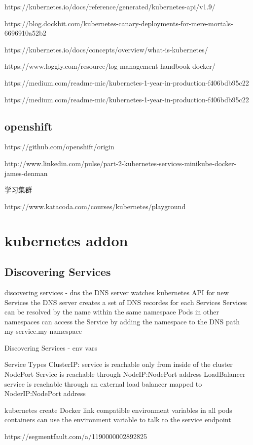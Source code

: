 https://kubernetes.io/docs/reference/generated/kubernetes-api/v1.9/


https://blog.dockbit.com/kubernetes-canary-deployments-for-mere-mortals-6696910a52b2

https://kubernetes.io/docs/concepts/overview/what-is-kubernetes/

https://www.loggly.com/resource/log-management-handbook-docker/

https://medium.com/readme-mic/kubernetes-1-year-in-production-f406bdb95c22


https://medium.com/readme-mic/kubernetes-1-year-in-production-f406bdb95c22

\subsection{openshift}

https://github.com/openshift/origin

http://www.linkedin.com/pulse/part-2-kubernetes-services-minikube-docker-james-denman


学习集群

https://www.katacoda.com/courses/kubernetes/playground


\section{kubernetes addon}


\subsection{Discovering Services}
discovering services - dns
the DNS server watches kubernetes API for new Services
the DNS server creates a set of DNS recordes for each Services
Services can be resolved by the name within the same namespace
Pods in other namespaces can access the Service by adding the namespace to the DNS path
  my-service.my-namespace

Discovering Services - env vars

Service Types
 ClusterIP: service is reachable only from inside of the cluster
NodePort
 Service is reachable through NodeIP:NodePort address
LoadBalancer
  service is reachable through an external load balancer mapped to NoderIP:NodePort address

kubernetes create Docker link compatible environment variables in all pods
containers can use the environment variable to talk to the service endpoint

https://segmentfault.com/a/1190000002892825


